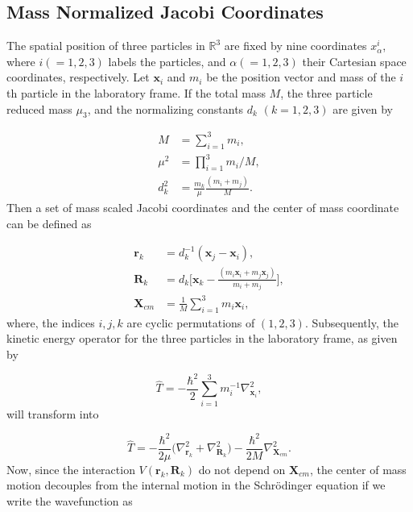 \documentclass{article}
\numberwithin{equation}{section}
\begin{document}
\subsection{Mass Normalized Jacobi Coordinates}
The spatial position of three particles in $\mathbb{R}^3$ are fixed by nine coordinates $x_{\alpha}^{i}$, where $i(=1,2,3)$ labels the particles, and $\alpha(=1,2,3)$ their Cartesian space coordinates, respectively. Let $\mathbf{x}_i$ and $m_{i}$ be the position vector and mass of the $i$th particle in the laboratory frame. If the total mass $M$, the three particle reduced mass $\mu_{3}$, and the normalizing constants $d_{k}$ $(k=1,2,3)$ are given by 

\begin{align}
M &= \sum_{i=1}^{3}m_i,  \label{eq:3,1} \\
\mu^2 &= \prod_{i=1}^{3}m_i/M,  \label{eq:3,2}\\
d_k^2 &= \frac{m_k}{\mu}\frac{(m_i+m_j)}{M}.  \label{eq:3,3}
\end{align}
Then a set of mass scaled Jacobi coordinates and the center of mass coordinate can be defined as

\begin{align}
\mathbf{r}_k &= d^{-1}_k(\mathbf{x}_{j}-\mathbf{x}_{i}),  \label{eq:4,1} \\
\mathbf{R}_k &= d_k\Big[\mathbf{x}_{k}-\frac{(m_{i}\mathbf{x}_{i}+m_{j}\mathbf{x}_{j})}{m_{i}+m_{j}}\Big],  \label{eq:4,2}\\
\mathbf{X}_{cm} &= \frac{1}{M} \sum_{i=1}^{3} m_{i} \mathbf{x}_{i},  \label{eq:4,3}
\end{align}   
where, the indices $i,j,k$ are cyclic permutations of $(1,2,3)$. Subsequently, the kinetic energy operator for the three particles in the laboratory frame, as given by 

\begin{equation}\label{eq:5}
\hat{T} = -\frac{\hbar^2}{2} \sum_{i=1}^{3} m_{i}^{-1} \nabla^{2}_{\mathbf{x}_{i}}, 
\end{equation}
will transform into

\begin{equation}\label{eq:6}
\hat{T} = -\frac{\hbar^2}{2\mu} \Big(\nabla^{2}_{\mathbf{r}_{k}}+\nabla^{2}_{\mathbf{R}_{k}}\Big) - \frac{\hbar^2}{2 M}\nabla^{2}_{\mathbf{X}_{cm}}. 
\end{equation}
Now, since the interaction $V(\mathbf{r}_k,\mathbf{R}_k)$ do not depend on $\mathbf{X}_{cm}$, the center of mass motion decouples from the internal motion in the Schr{\"o}dinger equation if we write the wavefunction as
\end{document}

